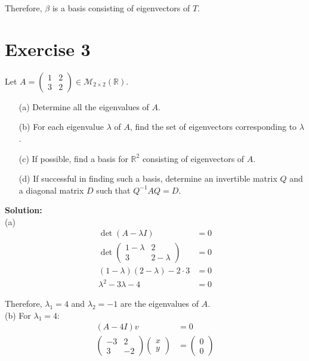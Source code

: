 \documentclass{article}
\begin{document}
Therefore, $\beta$ is a basis consisting of eigenvectors of $T$.

\newpage

\section*{Exercise 3}
Let $A = \begin{pmatrix} 1 & 2 \\ 3 & 2 \end{pmatrix} \in \mathcal{M}_{2\times 2}(\mathbb{R})$.

\begin{enumerate}
    \item[(a)] Determine all the eigenvalues of $A$.

    \item[(b)] For each eigenvalue $\lambda$ of $A$, find the set of eigenvectors corresponding to $\lambda$.

    \item[(c)] If possible, find a basis for $\mathbb{R}^2$ consisting of eigenvectors of $A$.

    \item[(d)] If successful in finding such a basis, determine an invertible matrix $Q$ and a diagonal matrix $D$ such that $Q^{-1}AQ = D$.
\end{enumerate}

\textbf{Solution:} \\

(a)
\begin{align*}
\det(A - \lambda I) &= 0\\
\det\begin{pmatrix} 1-\lambda & 2 \\ 3 & 2-\lambda \end{pmatrix} &= 0\\
(1-\lambda)(2-\lambda) - 2 \cdot 3 &= 0\\
\lambda^2 - 3\lambda - 4 &= 0
\end{align*}

Therefore, $\lambda_1 = 4$ and $\lambda_2 = -1$ are the eigenvalues of $A$. \\

(b)
For $\lambda_1 = 4$:
\begin{align*}
(A - 4I)v &= 0\\
\begin{pmatrix} -3 & 2 \\ 3 & -2 \end{pmatrix}\begin{pmatrix} x \\ y \end{pmatrix} &= \begin{pmatrix} 0 \\ 0 \end{pmatrix}
\end{align*}
\end{document}
